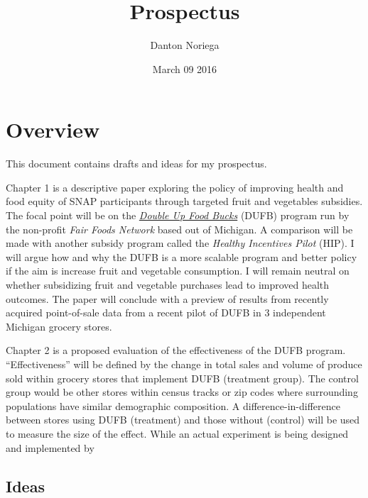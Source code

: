 \documentclass[11pt,letterpaper,]{book}
\title{Prospectus}
\author{Danton Noriega}
\date{March 09 2016}
\begin{document}
\maketitle

{
\hypersetup{linkcolor=black}
\setcounter{tocdepth}{1}
\tableofcontents
}
\chapter{Overview}\label{index}

This document contains drafts and ideas for my prospectus.

Chapter 1 is a descriptive paper exploring the policy of improving
health and food equity of SNAP participants through targeted fruit and
vegetables subsidies. The focal point will be on the
\href{http://www.doubleupfoodbucks.org/}{\emph{Double Up Food Bucks}}
(DUFB) program run by the non-profit \emph{Fair Foods Network} based out
of Michigan. A comparison will be made with another subsidy program
called the \emph{Healthy Incentives Pilot} (HIP). I will argue how and
why the DUFB is a more scalable program and better policy if the aim is
increase fruit and vegetable consumption. I will remain neutral on
whether subsidizing fruit and vegetable purchases lead to improved
health outcomes. The paper will conclude with a preview of results from
recently acquired point-of-sale data from a recent pilot of DUFB in 3
independent Michigan grocery stores.

Chapter 2 is a proposed evaluation of the effectiveness of the DUFB
program. ``Effectiveness'' will be defined by the change in total sales
and volume of produce sold within grocery stores that implement DUFB
(treatment group). The control group would be other stores within census
tracks or zip codes where surrounding populations have similar
demographic composition. A difference-in-difference between stores using
DUFB (treatment) and those without (control) will be used to measure the
size of the effect. While an actual experiment is being designed and
implemented by

\section{Ideas}\label{ideas}
\end{document}
